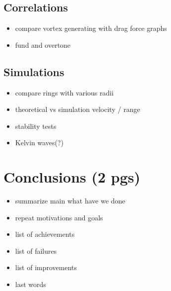 \documentclass[a4paper, 12pt]{report}
\newcommand{\<}{\langle} %
\renewcommand{\>}{\rangle} %
\begin{document}
\section{Correlations}
\begin{itemize}
	\item compare vortex generating with drag force graphs
	\item fund and overtone
\end{itemize}

\section{Simulations}
\begin{itemize}
	\item compare rings with various radii 
	\item theoretical vs simulation velocity / range
	\item stability tests
	\item Kelvin waves(?)
\end{itemize}

\newpage

\chapter{Conclusions (2 pgs)}

\begin{itemize}
	\item summarize main what have we done
	\item repeat motivations and goals
	\item list of achievements
	\item list of failures
	\item list of improvements
	\item last words
\end{itemize}

\newpage


\end{document}
